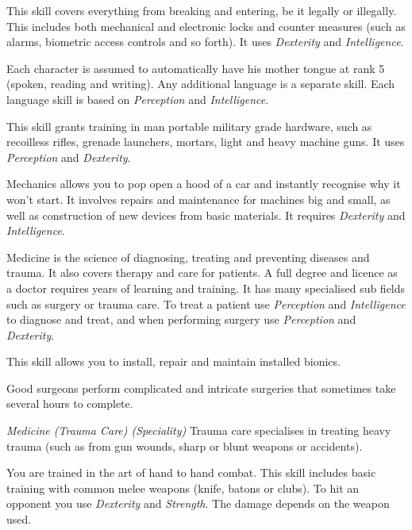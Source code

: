 \begin{description}
   This skill covers everything from breaking and entering, be
  it legally or illegally. This includes both mechanical and electronic locks and counter measures (such as alarms, biometric access controls and so forth). It
  uses \emph{Dexterity} and \emph{Intelligence}.

   Each character is assumed to automatically have his mother
  tongue at rank 5 (spoken, reading and writing). Any additional language is a
  separate skill. Each language skill is based on \emph{Perception} and
  \emph{Intelligence}.

   This skill grants training in man portable military
  grade hardware, such as recoilless rifles, grenade launchers, mortars, light
  and heavy machine guns. It uses \emph{Perception} and \emph{Dexterity}.

   Mechanics allows you to pop open a hood of a car and instantly recognise why it won't start. It involves repairs and maintenance for machines
  big and small, as well as construction of new devices from basic materials. It
  requires \emph{Dexterity} and \emph{Intelligence}.

   Medicine is the science of diagnosing, treating and
  preventing diseases and trauma. It also covers therapy and care for patients.
  A full degree and licence as a doctor requires years of learning and training.
  It has many specialised sub fields such as surgery or trauma care. To treat a
  patient use \emph{Perception} and \emph{Intelligence} to diagnose and treat,
  and when performing surgery use \emph{Perception} and \emph{Dexterity}.

   This skill allows you to install, repair and maintain installed bionics.

   Good surgeons perform complicated and
  intricate surgeries that sometimes take several hours to complete.

  \emph{Medicine (Trauma Care) (Speciality)} Trauma care specialises in treating
  heavy trauma (such as from gun wounds, sharp or blunt weapons or accidents).

   You are trained in the art of hand to hand combat. This
  skill includes basic training with common melee weapons (knife, batons or
  clubs). To hit an opponent you use \emph{Dexterity} and \emph{Strength}.
  The damage depends on the weapon used.


\end{description}
